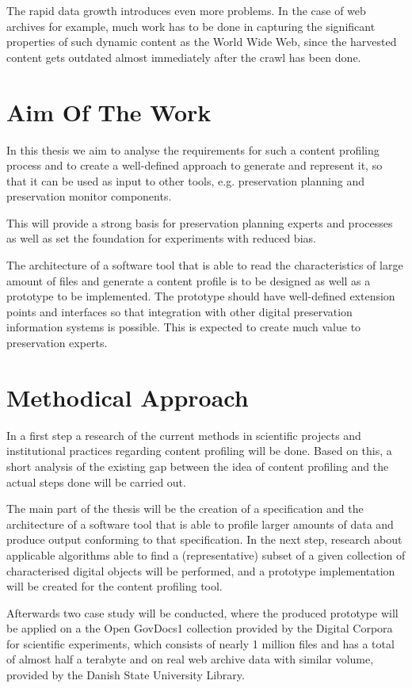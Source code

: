 The rapid data growth introduces even more problems.
In the case of web archives for example, much work has to be done in capturing the significant properties of such dynamic content as the World Wide Web, since the harvested content gets outdated almost immediately after the crawl has been done.

\section{Aim Of The Work}
\label{sec:aim_of_the_work}
In this thesis we aim to analyse the requirements for such a content profiling process and to create a well-defined approach to generate and represent it, so that it can be used as input to other tools, e.g. preservation planning and preservation monitor components.

This will provide a strong basis for preservation planning experts and processes as well as set the foundation for experiments with reduced bias.

The architecture of a software tool that is able to read the characteristics of large amount of files and generate a content
profile is to be designed as well as a prototype to be implemented.
The prototype should have well-defined extension points and interfaces so that integration with other digital preservation information systems is possible.
This is expected to create much value to preservation experts.

\section{Methodical Approach}
\label{sec:methodical_approach}
In a first step a research of the current methods in scientific projects and institutional practices regarding content profiling will be done.
Based on this, a short analysis of the existing gap between the idea of content profiling and the actual steps done will be carried out. 

The main part of the thesis will be the creation of a specification and the architecture of a software tool that is able to profile larger amounts of data and produce output conforming to that specification. In the next step, research about applicable algorithms able to find a (representative) subset of a given collection of characterised digital objects will be performed, and a prototype implementation will be created for the content profiling tool. 

Afterwards two case study will be conducted, where the produced prototype will be applied on a the Open GovDocs1 collection provided by the Digital Corpora for scientific experiments, which consists of nearly 1 million files and has a total of almost half a terabyte and on real web archive data with similar volume, provided by the Danish State University Library. 

